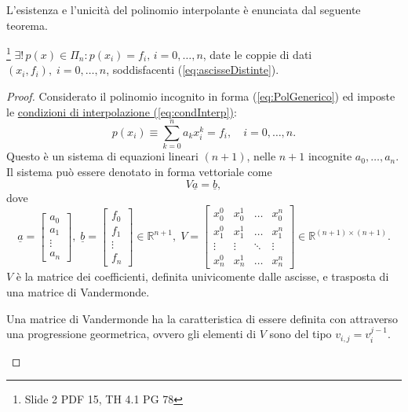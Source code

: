 L'esistenza e l'unicità del polinomio interpolante è enunciata dal seguente teorema.
\begin{theorem}\label{th:EsisUnicPolInterp}\footnote{Slide 2 PDF 15, TH 4.1 PG 78}
    $\exists!\, p(x)\in\Pi_n: p(x_i)=f_i,\, i=0,\hdots,n$, date le coppie di dati $(x_i,f_i),\; i=0,\hdots,n$, soddisfacenti (\ref{eq:ascisseDistinte}).
\end{theorem}
\begin{proof}
    Considerato il polinomio incognito in forma (\ref{eq:PolGenerico}) ed imposte le \underline{condizioni di interpolazione (\ref{eq:condInterp})}:
    \begin{equation}\label{eq:InterpEqLin}
        p(x_i)\equiv\sum_{k=0}^{n}a_kx_i^k=f_i,\quad i=0,\hdots,n.
    \end{equation}
    Questo è un sistema di equazioni lineari $(n+1)$, nelle $n+1$ incognite $a_0,\hdots,a_n$. Il sistema può essere denotato in forma vettoriale come
    \begin{equation}\label{eq:sistemaVand}
        V\underline{a}=\underline{b},
    \end{equation}
    dove
    \begin{equation*}
        \underline{a} = 
    \begin{bmatrix}
        a_0\\
        a_1\\
        \vdots\\
        a_n
    \end{bmatrix},\; \underline{b}=
    \begin{bmatrix}
        f_0\\
        f_1\\
        \vdots\\
        f_n
    \end{bmatrix}\in\mathbb R^{n+1},\;
    V=\begin{bmatrix}
        x_0^0 & x_0^1 & \hdots & x_0^n\\
        x_1^0 & x_1^1 & \hdots & x_1^n\\
        \vdots & \vdots &\ddots & \vdots\\
        x_n^0 & x_n^1 & \hdots & x_n^n
    \end{bmatrix}\in\mathbb R^{(n+1)\times (n+1)}.
    \end{equation*}
    $V$ è la matrice dei coefficienti, definita univicomente dalle ascisse, e trasposta di una matrice di Vandermonde.

    \begin{definition}
        Una matrice di Vandermonde ha la caratteristica di essere definita con attraverso una progressione geormetrica, ovvero gli elementi di $V$ sono del tipo $v_{i,j}=v_i^{j-1}$.
    \end{definition}
    

\end{proof}
